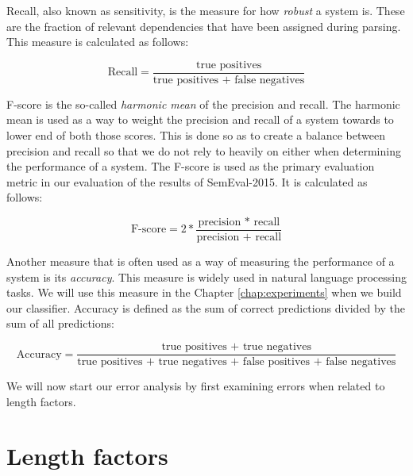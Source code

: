 Recall, also known as sensitivity, is the measure for how \textit{robust} a system is. These are the fraction of relevant dependencies that have been assigned during parsing. This measure is calculated as follows:

\begin{equation*}
    \text{Recall} = \frac{\text{true positives}}{\text{true positives + false
            negatives}}
\end{equation*}

\vspace{1ex}

F-score is the so-called \textit{harmonic mean} of the precision and recall. The harmonic mean is used as a way to weight the precision and recall of a system towards to lower end of both those scores. This is done so as to create a balance between precision and recall so that we do not rely to heavily on either when determining the performance of a system. The F-score is used as the primary evaluation metric in our evaluation of the results of SemEval-2015. It is calculated as follows:

\begin{equation*}
    \text{F-score} = 2*\frac{\text{precision * recall}}{\text{precision + recall}}
\end{equation*}

Another measure that is often used as a way of measuring the performance of a system is its \textit{accuracy}. This measure is widely used in natural language processing tasks. We will use this measure in the Chapter \ref{chap:experiments} when we build our classifier. Accuracy is defined as the sum of correct predictions divided by the sum of all predictions:

\begin{equation*}
    \text{Accuracy} = \frac{\text{true positives + true negatives}}{\text{true positives + true negatives + false positives + false negatives}}
\end{equation*}


\vspace{1ex}

We will now start our error analysis by first examining errors when related to length factors.
    
\section{Length factors}


